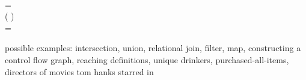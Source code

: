 \begin{code}
   \isa {}\\
   =
  \\[\betweenfunctionskip]
   \isa \iso( \x {}) \to \tbool\\
   \< =
\end{code}

\noindent
possible examples: intersection, union, relational join, filter, map, constructing a control flow graph, reaching definitions, unique drinkers, purchased-all-items, directors of movies tom hanks starred in
